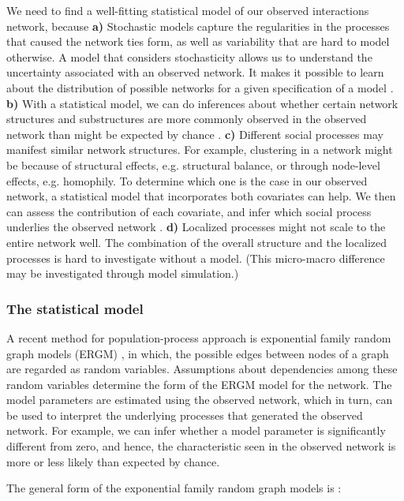 \documentclass{acm_proc_article-sp}
\begin{document}
We need to find a well-fitting statistical model of our observed interactions network, because \textbf{a)} Stochastic models capture the regularities in the processes that caused the network ties form, as well as variability that are hard to model otherwise. A model that considers stochasticity allows us to understand the uncertainty associated with an observed network. It makes it possible to learn about the distribution of possible networks for a given specification of a model \cite{Robins}. \textbf{b)} With a statistical model, we can do inferences about whether certain network structures and substructures are more commonly observed in the observed network than might be expected by chance \cite{Robins}. \textbf{c)} Different social processes may manifest similar network structures. For example, clustering in a network might be because of structural effects, e.g. structural balance, or through node-level effects, e.g. homophily. To determine which one is the case in our observed network, a statistical model that incorporates both covariates can help. We then can assess the contribution of each covariate, and infer which social process underlies the observed network \cite{Robins}. \textbf{d)} Localized processes might not scale to the entire network well. The combination of the overall structure and the localized processes is hard to investigate without a model. (This micro-macro difference may be investigated through model simulation.)\cite{Robins}

\subsubsection{The statistical model}

A recent method for population-process approach is exponential family random graph models (ERGM) \cite{Robins}, in which, the possible edges between nodes of a graph are regarded as random variables. Assumptions about dependencies among these random variables determine the form of the ERGM model for the network. The model parameters are estimated using the observed network, which in turn, can be used to interpret the underlying processes that generated the observed network. For example, we can infer whether a model parameter is significantly different from zero, and hence, the characteristic seen in the observed network is more or less likely than expected by chance.

The general form of the exponential family random graph models is \cite{Krivitsky}: 
\end{document}
